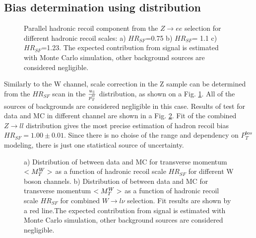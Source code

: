 \subsection{Bias determination using \upar distribution}




\begin{figure}[!tbp]
\endminipage\hfill
{}
\endminipage\hfill
{}%
\endminipage
\caption{Parallel hadronic recoil component \upar from the $Z\to ee$ selection for different hadronic recoil scales: a) $HR_{SF}$=0.75 b) $HR_{SF}$= 1.1 c) $HR_{SF}$=1.23. The expected contribution from signal is estimated with Monte Carlo simulation, other background sources are considered negligible.}
\label{HadrRecoil:ZScan}
\end{figure}
 
Similarly to the W channel, scale correction in the Z sample can be determined from the $HR_{SF}$ scan in the $\frac{u_{\parallel}}{p_T^{ll}}$ distribution, as shown on a Fig. \ref{HadrRecoil:ZScan}. All of the sources of backgrounds are considered negligible in this case. Results of \chiD test for data and MC in different channel are shown in a Fig. \ref{uPAr}. Fit of the combined $Z \to ll$ distribution gives the most precise estimation of hadron recoil bias $HR_{SF} = 1.00 \pm 0.01$.  Since there is no choise of the range and dependency on $P_T^{bos}$ modeling, there is just one statistical source of uncertainty.


\begin{figure}[!tbp]
\begin{minipage}[h]{0.49\linewidth}
\end{minipage}
\hfill
\begin{minipage}[h]{0.49\linewidth}
\end{minipage}
\caption{a) Distribution of \chiD  between data and MC for transverse momentum $<M_T^W>$ as a function of hadronic recoil scale $HR_{SF}$ for different W boson channels. 
b) Distribution of \chiD  between data and MC for transverse momentum $<M_T^W>$ as a function of hadronic recoil scale $HR_{SF}$ for combined $W \to l \nu$ selection. Fit results are shown by a red line.The expected contribution from signal is estimated with Monte Carlo simulation, other background sources are considered negligible.}
\label{uPAr}
\end{figure}  
  
